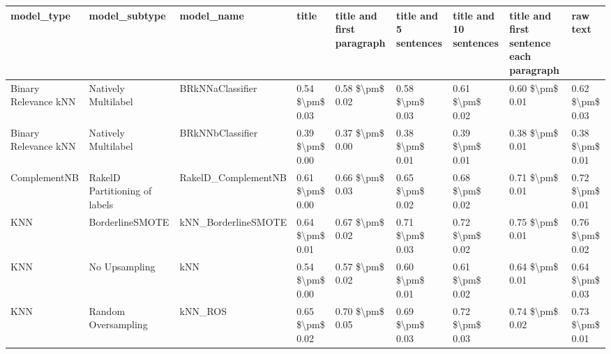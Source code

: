 \begin{tabular}{lllllllll}
\toprule
                     model\_type &                 model\_subtype &                                   model\_name &               title & title and first paragraph & title and 5 sentences & title and 10 sentences & title and first sentence each paragraph &        raw text \\
\midrule
           Binary Relevance kNN &           Natively Multilabel &                             BRkNNaClassifier &     0.54 \$\textbackslash pm\$ 0.03 &           0.58 \$\textbackslash pm\$ 0.02 &       0.58 \$\textbackslash pm\$ 0.03 &        0.61 \$\textbackslash pm\$ 0.02 &                         0.60 \$\textbackslash pm\$ 0.01 & 0.62 \$\textbackslash pm\$ 0.03 \\
           Binary Relevance kNN &           Natively Multilabel &                             BRkNNbClassifier &     0.39 \$\textbackslash pm\$ 0.00 &           0.37 \$\textbackslash pm\$ 0.00 &       0.38 \$\textbackslash pm\$ 0.01 &        0.39 \$\textbackslash pm\$ 0.01 &                         0.38 \$\textbackslash pm\$ 0.01 & 0.38 \$\textbackslash pm\$ 0.01 \\
                   ComplementNB & RakelD Partitioning of labels &                          RakelD\_ComplementNB &     0.61 \$\textbackslash pm\$ 0.00 &           0.66 \$\textbackslash pm\$ 0.03 &       0.65 \$\textbackslash pm\$ 0.02 &        0.68 \$\textbackslash pm\$ 0.02 &                         0.71 \$\textbackslash pm\$ 0.01 & 0.72 \$\textbackslash pm\$ 0.01 \\
                            KNN &               BorderlineSMOTE &                          kNN\_BorderlineSMOTE &     0.64 \$\textbackslash pm\$ 0.01 &           0.67 \$\textbackslash pm\$ 0.02 &       0.71 \$\textbackslash pm\$ 0.03 &        0.72 \$\textbackslash pm\$ 0.02 &                         0.75 \$\textbackslash pm\$ 0.01 & 0.76 \$\textbackslash pm\$ 0.02 \\
                            KNN &                 No Upsampling &                                          kNN &     0.54 \$\textbackslash pm\$ 0.00 &           0.57 \$\textbackslash pm\$ 0.02 &       0.60 \$\textbackslash pm\$ 0.01 &        0.61 \$\textbackslash pm\$ 0.02 &                         0.64 \$\textbackslash pm\$ 0.01 & 0.64 \$\textbackslash pm\$ 0.03 \\
                            KNN &           Random Oversampling &                                      kNN\_ROS &     0.65 \$\textbackslash pm\$ 0.02 &           0.70 \$\textbackslash pm\$ 0.05 &       0.69 \$\textbackslash pm\$ 0.03 &        0.72 \$\textbackslash pm\$ 0.03 &                         0.74 \$\textbackslash pm\$ 0.02 & 0.73 \$\textbackslash pm\$ 0.01 \\

\end{tabular}
